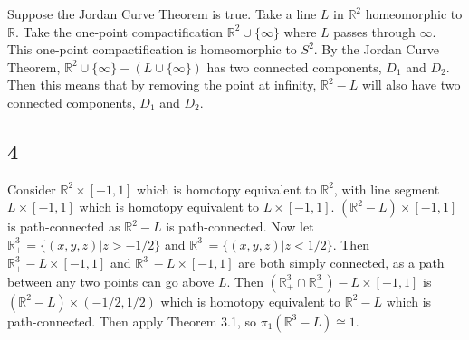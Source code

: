 \documentclass{article}
\theoremstyle{definition}
\numberwithin{theorem}{section}
\numberwithin{equation}{section}
\begin{document}
Suppose the Jordan Curve Theorem is true. Take a line $L$ in $\mathbb{R}^2$ homeomorphic to $\mathbb{R}$. Take the one-point compactification $\mathbb{R}^2 \cup \{\infty\}$ where $L$ passes through $\infty$. This one-point compactification is homeomorphic to $S^2$. By the Jordan Curve Theorem, $\mathbb{R}^2 \cup \{\infty\} - (L \cup \{\infty \})$ has two connected components, $D_1$ and $D_2$. Then this means that by removing the point at infinity, $\mathbb{R}^2 - L$ will also have two connected components, $D_1$ and $D_2$. 

\subsection{4}
Consider $\mathbb{R}^2 \times [-1,1]$ which is homotopy equivalent to $\mathbb{R}^2$, with line segment $L \times [-1,1]$ which is homotopy equivalent to $L \times [-1,1]$. $\left(\mathbb{R}^2 - L \right)\times [-1,1]$ is path-connected as $\mathbb{R}^2 - L$ is path-connected. Now let $\mathbb{R}^3_+ = \{(x, y, z) | z > -1/2\}$ and $\mathbb{R}^3_- = \{(x, y, z) | z < 1/2\}$. Then $\mathbb{R}^3_+ - L \times [-1,1]$ and $\mathbb{R}^3_- - L \times [-1,1]$ are both simply connected, as a path between any two points can go above $L$. Then $\left(\mathbb{R}^3_+ \cap \mathbb{R}^3_-\right) - L \times [-1,1]$ is $(\mathbb{R}^2 - L) \times (-1/2, 1/2)$ which is homotopy equivalent to  $\mathbb{R}^2 - L$ which is path-connected. Then apply Theorem 3.1, so $\pi_1(\mathbb{R}^3 - L) \cong 1$. 
\end{document}
